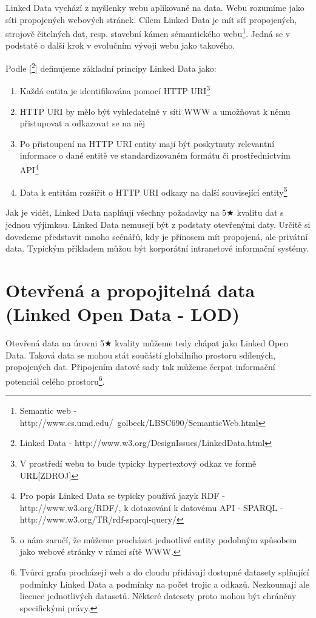Linked Data vychází z myšlenky webu aplikované na data. Webu rozumíme jako síti propojených webových stránek. Cílem Linked Data je mít síť propojených, strojově čitelných dat, resp. stavební kámen sémantického webu\footnote{Semantic web - http://www.cs.umd.edu/~golbeck/LBSC690/SemanticWeb.html}. Jedná se v podstatě o další krok v evolučním vývoji webu jako takového.

Podle [\footnote{Linked Data - http://www.w3.org/DesignIssues/LinkedData.html}] definujeme základní principy Linked Data jako:

\begin{enumerate}
\item Každá entita je identifikována pomocí HTTP URI\footnote{V prostředí webu to bude typicky hypertextový odkaz ve formě URL[ZDROJ]}    
\item HTTP URI by mělo být vyhledatelné v síti WWW a umožňovat k němu přistupovat a odkazovat se na něj
\item Po přistoupení na HTTP URI entity mají být poskytnuty relevantní informace o dané entitě ve standardizovaném formátu či prostřednictvím API\footnote{Pro popis Linked Data se typicky používá jazyk RDF - http://www.w3.org/RDF/, k dotazování k datovému API - SPARQL - http://www.w3.org/TR/rdf-sparql-query/}
\item Data k entitám rozšířit o HTTP URI odkazy na další související entity\footnote{o nám zaručí, že můžeme procházet jednotlivé entity podobným způsobem jako webové stránky v rámci sítě WWW.}
\end{enumerate}

Jak je vidět, Linked Data naplňují všechny požadavky na 5$\bigstar$ kvalitu dat s jednou výjimkou. Linked Data nemusejí být z podstaty otevřenými daty. Určitě si dovedeme představit mnoho scénářů, kdy je přínosem mít propojená, ale privátní data. Typickým příkladem můžou být korporátní intranetové informační systémy.

\section{Otevřená a propojitelná data (Linked Open Data - LOD)}

Otevřená data na úrovni 5$\bigstar$ kvality můžeme tedy chápat jako Linked Open Data. Taková data se mohou stát součástí globálního prostoru sdílených, propojených dat. Připojením datové sady tak můžeme čerpat informační potenciál celého prostoru\footnote{Tvůrci grafu procházejí web a do cloudu přidávají dostupné datasety splňující podmínky Linked Data a podmínky na počet trojic a odkazů. Nezkoumají ale licence jednotlivých datasetů. Některé datesety proto mohou být chráněny specifickými právy.}.

